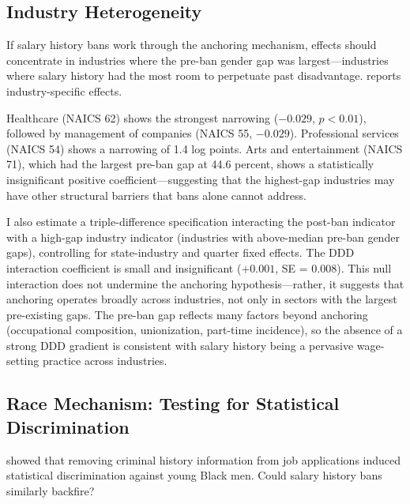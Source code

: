 \documentclass[12pt]{article}
\begin{document}
\subsection{Industry Heterogeneity}



If salary history bans work through the anchoring mechanism, effects should concentrate in industries where the pre-ban gender gap was largest---industries where salary history had the most room to perpetuate past disadvantage.  reports industry-specific effects.

Healthcare (NAICS 62) shows the strongest narrowing ($-0.029$, $p < 0.01$), followed by management of companies (NAICS 55, $-0.029$). Professional services (NAICS 54) shows a narrowing of 1.4 log points. Arts and entertainment (NAICS 71), which had the largest pre-ban gap at 44.6 percent, shows a statistically insignificant positive coefficient---suggesting that the highest-gap industries may have other structural barriers that bans alone cannot address.

I also estimate a triple-difference specification interacting the post-ban indicator with a high-gap industry indicator (industries with above-median pre-ban gender gaps), controlling for state-industry and quarter fixed effects. The DDD interaction coefficient is small and insignificant ($+0.001$, SE = $0.008$). This null interaction does not undermine the anchoring hypothesis---rather, it suggests that anchoring operates broadly across industries, not only in sectors with the largest pre-existing gaps. The pre-ban gap reflects many factors beyond anchoring (occupational composition, unionization, part-time incidence), so the absence of a strong DDD gradient is consistent with salary history being a pervasive wage-setting practice across industries.

\subsection{Race Mechanism: Testing for Statistical Discrimination}



\citet{DoleacHansen2020} showed that removing criminal history information from job applications induced statistical discrimination against young Black men. Could salary history bans similarly backfire?
\end{document}
